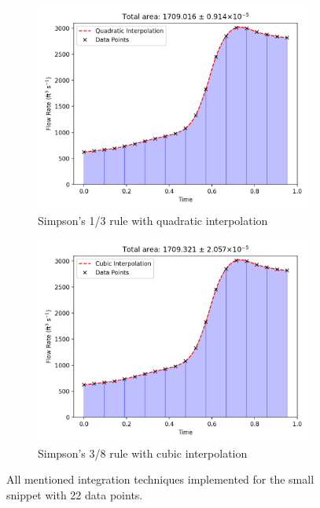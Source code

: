 \begin{figure}[H]
     \begin{subfigure}[b]{0.45\textwidth}
         \centering
         \includegraphics[width=\textwidth]{Figures/2/simpsons13.png}
         \caption{Simpson's 1/3 rule with quadratic interpolation}
     \end{subfigure}
     \begin{subfigure}[b]{0.45\textwidth}
         \centering
         \includegraphics[width=\textwidth]{Figures/2/simpsons38.png}
         \caption{Simpson's 3/8 rule with cubic interpolation}
     \end{subfigure}
    \caption{All mentioned integration techniques implemented for the small snippet with 22 data points.}
\end{figure}

